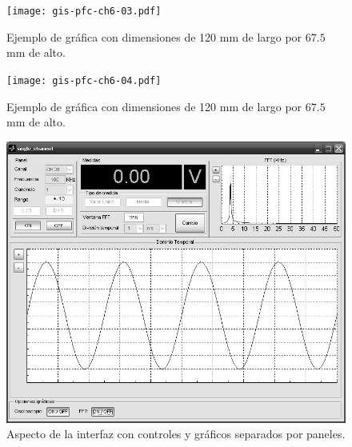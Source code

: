 \documentclass[a4paper,12pt]				{article}
\begin{document}
\begin{figure}
	\begin{center}
		\texttt{[image: gis-pfc-ch6-03.pdf]}
	\end{center}
	\caption[Ejemplo de gráfica]{Ejemplo de gráfica con dimensiones de
	120 mm de largo por $67.5$ mm de alto.}
\end{figure}

\begin{figure}
	\begin{center}
		\texttt{[image: gis-pfc-ch6-04.pdf]}
	\end{center}
	\caption[Ejemplo de gráfica]{Ejemplo de gráfica con dimensiones de
	120 mm de largo por $67.5$ mm de alto.}
\end{figure}

\begin{figure}
	\begin{center}
		\includegraphics{gis-pfc-appa-01.png}
	\end{center}
	\caption[Aspecto de la interfaz de usuario]{Aspecto de la interfaz
	con controles y gráficos separados por paneles.}
	\label{fig:interface}
\end{figure}
\end{document}
